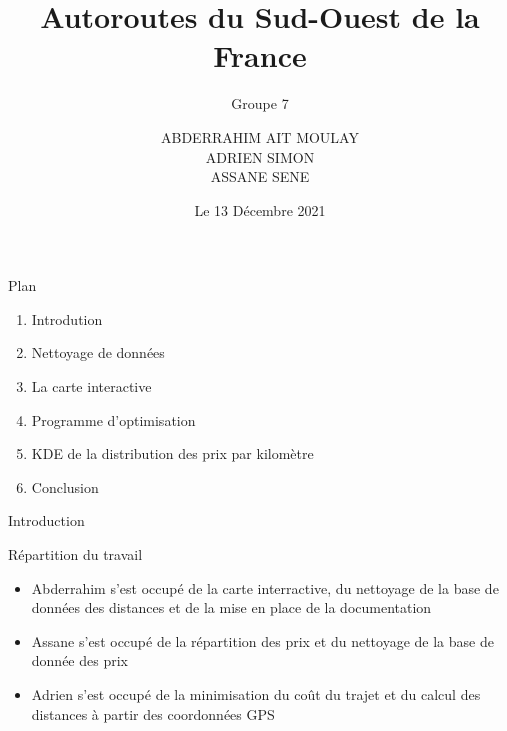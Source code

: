 \documentclass[aspectratio=169]{beamer}
\title[ICT Presentations]{Autoroutes du Sud-Ouest de la France }
\subtitle{Groupe 7}
\institute[TU Wien]{FDS Montpellier}
\date{Le 13 Décembre 2021}
\author[A. Jantsch]{ABDERRAHIM AIT MOULAY \\ ADRIEN SIMON \\ ASSANE SENE}
\begin{document}
\begin{frame}
  \titlepage
\end{frame}      


\begin{frame}{Plan}
  

   \begin{enumerate}
       \item Introdution 
       \item Nettoyage de données 
       \item La carte interactive
       \item Programme d'optimisation
       \item KDE de la distribution des prix par kilomètre
       \item Conclusion 
       
   \end{enumerate}


\end{frame}


\begin{frame}{Introduction}

\begin{block}{Répartition du travail}
 \begin{itemize}
    \item Abderrahim s'est occupé de la carte interractive, du nettoyage de la base de données des distances et de la mise en place de la documentation
    \item Assane s'est occupé de la répartition des prix et du nettoyage de la base de donnée des prix
    \item Adrien s'est occupé de la minimisation du coût du trajet et du calcul des distances à partir des coordonnées GPS
    
\end{itemize}
\end{block}
    
\end{frame}


\end{document}
